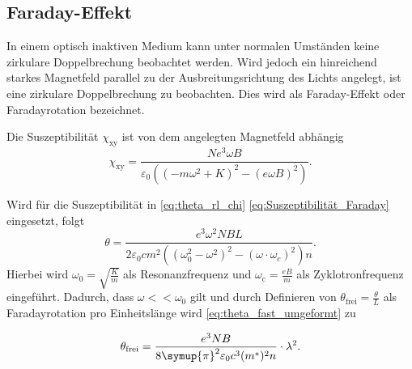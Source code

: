 \subsection{Faraday-Effekt}
\label{subsec:Faraday-Effekt}
In einem optisch inaktiven Medium kann unter normalen Umständen keine zirkulare Doppelbrechung beobachtet werden. Wird jedoch ein hinreichend starkes Magnetfeld parallel
zu der Ausbreitungsrichtung des Lichts angelegt, ist eine zirkulare Doppelbrechung zu beobachten. Dies wird als Faraday-Effekt oder Faradayrotation bezeichnet.

Die Suszeptibilität $\chi_\text{xy}$ ist von dem angelegten Magnetfeld abhängig
\begin{equation}
    \chi_\text{xy} = \frac{Ne^3\omega B}{\varepsilon_0\left(\left(-m\omega^2+K\right)^2-\left(e\omega B\right)^2\right)}.
    \label{eq:Suszeptibilität_Faraday}
\end{equation}

Wird für die Suszeptibilität in \eqref{eq:theta_rl_chi} \autoref{eq:Suszeptibilität_Faraday} eingesetzt, folgt
\begin{equation}
    \theta = \frac{e^3\omega^2 NBL} {2\varepsilon_0 cm^2\left(\left(\omega_0^2-\omega^2\right)^2-\left(\omega \cdot \omega_c\right)^2\right)n}.
    \label{eq:theta_fast_umgeformt}
\end{equation}
Hierbei wird $\omega_0 = \sqrt{\frac{K}{m}}$ als Resonanzfrequenz und $\omega_\text{c} = \frac{eB}{m}$ als Zyklotronfrequenz eingeführt. Dadurch, dass $\omega << \omega_0$ gilt
und durch Definieren von $\theta_\text{frei} = \frac{\theta}{L}$ als Faradayrotation pro Einheitslänge wird \eqref{eq:theta_fast_umgeformt} zu

\begin{equation}
    \label{eqn:theta_l2}
    \theta_\text{frei} = \frac{e^3 N B}{8\symup{\pi}^2 \varepsilon_0 c^3 (m^*)^2 n} \cdot \lambda^2.
\end{equation}
